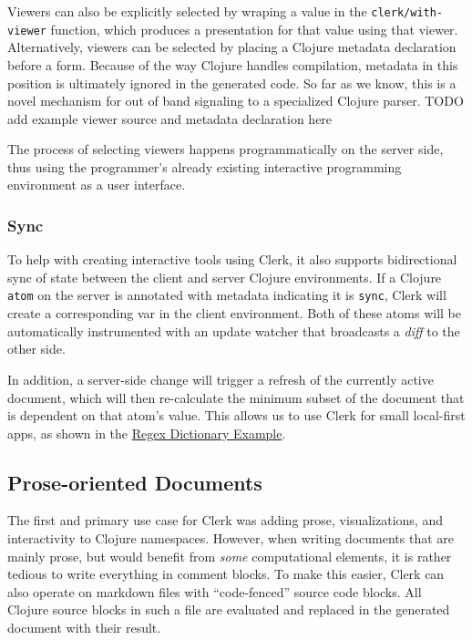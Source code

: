 \documentclass[
]{article}
\newcommand{\passthrough}[1]{#1}
\begin{document}
Viewers can also be explicitly selected by wraping a value in the \passthrough{\lstinline!clerk/with-viewer!} function, which produces a presentation for that value using that viewer. Alternatively, viewers can be selected by placing a Clojure metadata declaration before a form. Because of the way Clojure handles compilation, metadata in this position is ultimately ignored in the generated code. So far as we know, this is a novel mechanism for out of band signaling to a specialized Clojure parser. TODO add example viewer source and metadata declaration here

The process of selecting viewers happens programmatically on the server side, thus using the programmer's already existing interactive programming environment as a user interface.

\hypertarget{id}{%
\subsubsection{Sync}\label{id}}

To help with creating interactive tools using Clerk, it also supports bidirectional sync of state between the client and server Clojure environments. If a Clojure \passthrough{\lstinline!atom!} on the server is annotated with metadata indicating it is \passthrough{\lstinline!sync!}, Clerk will create a corresponding var in the client environment. Both of these atoms will be automatically instrumented with an update watcher that broadcasts a \emph{diff} to the other side.

In addition, a server-side change will trigger a refresh of the currently active document, which will then re-calculate the minimum subset of the document that is dependent on that atom's value. This allows us to use Clerk for small local-first apps, as shown in the \protect\hyperlink{regex-dictionary}{Regex Dictionary Example}.

\hypertarget{id}{%
\subsection{Prose-oriented Documents}\label{id}}

The first and primary use case for Clerk was adding prose, visualizations, and interactivity to Clojure namespaces. However, when writing documents that are mainly prose, but would benefit from \emph{some} computational elements, it is rather tedious to write everything in comment blocks. To make this easier, Clerk can also operate on markdown files with ``code-fenced'' source code blocks. All Clojure source blocks in such a file are evaluated and replaced in the generated document with their result.
\end{document}

